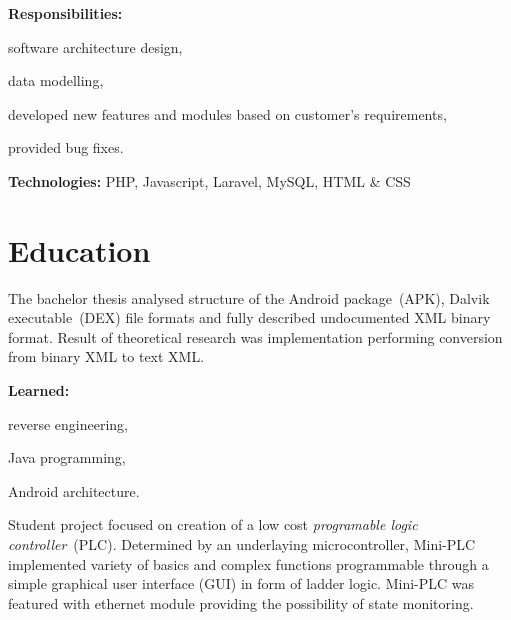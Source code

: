 \documentclass[a4paper]{deedy-resume}
\begin{document}
\vspace{\topsep}
\textbf{Responsibilities:}
\begin{tightitemize}
    \item software architecture design,
    \item data modelling,
    \item developed new features and modules based on customer's requirements,
    \item provided bug fixes.
\end{tightitemize}
\vspace{\topsep}
\footnotesize\textbf{Technologies:} PHP, Javascript, Laravel, MySQL, HTML \& CSS
\normalsize
\vspace{5pt}
\section{Education}
\vspace{\topsep}
\vspace{\topsep}
\vspace{\topsep}
The bachelor thesis analysed structure of the Android package~(APK), Dalvik executable~(DEX) file formats and fully described undocumented XML binary format.
Result of theoretical research was implementation performing conversion from binary XML to text XML.

\vspace{\topsep}
\textbf{Learned:}
\begin{tightitemize}
    \item reverse engineering,
    \item Java programming,
    \item Android architecture.
\end{tightitemize}
\sectionspace
\vspace{\topsep}
\vspace{\topsep}
Student project focused on creation of a low cost \textit{programable logic controller}~(PLC).
Determined by an underlaying microcontroller, Mini-PLC implemented variety of basics and complex functions programmable through a simple graphical user interface (GUI) in form of ladder logic.
Mini-PLC was featured with ethernet module providing the possibility of state monitoring.
\end{document}
